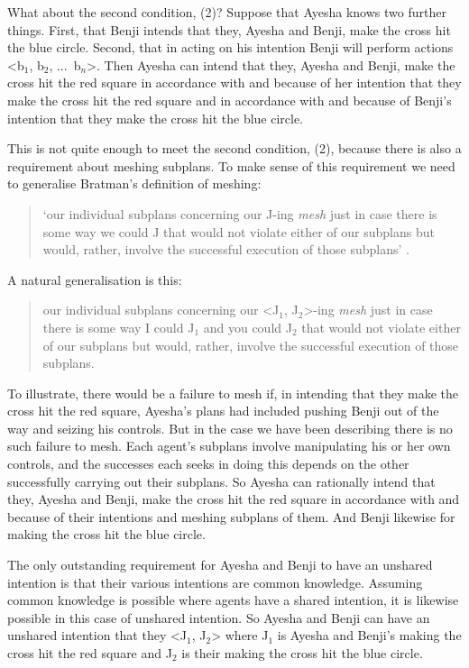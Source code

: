 \documentclass[12pt,\papersize]{extarticle}
\begin{document}
What about the second condition, (2)?
Suppose that Ayesha knows two further things.
First, that Benji intends that they, Ayesha and Benji, make the cross hit the blue circle.
Second, that in acting on his intention Benji will perform actions <b$_1$, b$_2$, ...\ b$_n$>.
Then Ayesha can intend that they, Ayesha and Benji, make the cross hit the red square in accordance with and because of her intention that they make the cross hit the red square and in accordance with and because of Benji's intention that they make the cross hit the blue circle.

This is not quite enough to meet the second condition, (2), because there is also a requirement about meshing subplans. 
To make sense of this requirement we need to generalise Bratman's definition of meshing:
\begin{quote}
`our individual subplans concerning our J-ing \emph{mesh} just in case there is some way we could J that would not violate either of our subplans but would, rather, involve the successful execution of those subplans' \citep[p.\ 106]{Bratman:1993je}.
\end{quote}
A natural generalisation is this:
\begin{quote}
our individual subplans concerning our <J$_1$, J$_2$>-ing \emph{mesh} just in case there is some way I could J$_1$ and you could J$_2$ that would not violate either of our subplans but would, rather, involve the successful execution of those subplans. 
\end{quote}
%
To illustrate, 
there would be a failure to mesh if, in intending that they make the cross hit the red square,  Ayesha's plans had included pushing Benji out of the way and seizing his controls. 
But in the case we have been describing there is no such failure to mesh.
Each agent's subplans involve manipulating his or her own controls,
and the successes each seeks in doing this depends on the other successfully carrying out their subplans.
So Ayesha can rationally intend that they, Ayesha and Benji, make the cross hit the red square in accordance with and because of their intentions and meshing subplans of them.
And Benji likewise for making the cross hit the blue circle.

The only outstanding requirement for Ayesha and Benji to have an unshared intention is that their various intentions are common knowledge. 
Assuming common knowledge is possible where agents have a shared intention, it is likewise possible in this case of unshared intention.
So Ayesha and Benji can have an unshared intention that they <J$_1$, J$_2$> where J$_1$ is Ayesha and Benji's making the cross hit the red square and J$_2$ is their making the cross hit the blue circle.
\end{document}
